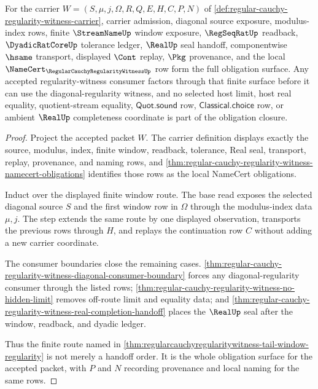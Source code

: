 \begin{theorem}
\label{thm:regular-cauchy-regularity-witness-obligation-closure}
For the carrier $W=(S,\mu,j,\Omega,R,Q,E,H,C,P,N)$ of \autoref{def:regular-cauchy-regularity-witness-carrier}, carrier admission, diagonal source exposure, modulus-index rows, finite $\StreamNameUp$ window exposure, $\RegSeqRatUp$ readback, $\DyadicRatCoreUp$ tolerance ledger, $\RealUp$ seal handoff, componentwise $\hsame$ transport, displayed $\Cont$ replay, $\Pkg$ provenance, and the local $\NameCert_{\RegularCauchyRegularityWitnessUp}$ row form the full obligation surface. Any accepted regularity-witness consumer factors through that finite surface before it can use the diagonal-regularity witness, and no selected host limit, host real equality, quotient-stream equality, $\mathsf{Quot.sound}$ row, $\mathsf{Classical.choice}$ row, or ambient $\RealUp$ completeness coordinate is part of the obligation closure.
\end{theorem}
\begin{proof}
Project the accepted packet $W$. The carrier definition displays exactly the source, modulus, index, finite window, readback, tolerance, Real seal, transport, replay, provenance, and naming rows, and \autoref{thm:regular-cauchy-regularity-witness-namecert-obligations} identifies those rows as the local NameCert obligations.

Induct over the displayed finite window route. The base read exposes the selected diagonal source $S$ and the first window row in $\Omega$ through the modulus-index data $\mu,j$. The step extends the same route by one displayed observation, transports the previous rows through $H$, and replays the continuation row $C$ without adding a new carrier coordinate.

The consumer boundaries close the remaining cases. \autoref{thm:regular-cauchy-regularity-witness-diagonal-consumer-boundary} forces any diagonal-regularity consumer through the listed rows; \autoref{thm:regular-cauchy-regularity-witness-no-hidden-limit} removes off-route limit and equality data; and \autoref{thm:regular-cauchy-regularity-witness-real-completion-handoff} places the $\RealUp$ seal after the window, readback, and dyadic ledger.

Thus the finite route named in \autoref{thm:regularcauchyregularitywitness-tail-window-regularity} is not merely a handoff order. It is the whole obligation surface for the accepted packet, with $P$ and $N$ recording provenance and local naming for the same rows.
\end{proof}

